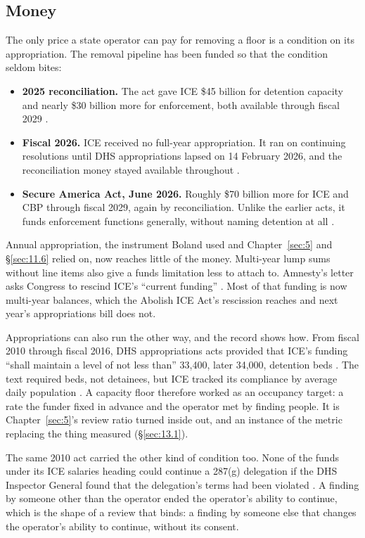 \subsection{Money}
\label{sec:9.4.3}
The only price a state operator can pay for removing a floor is a condition on its appropriation. The removal pipeline has been funded so that the condition seldom bites:

\begin{itemize}
\item \textbf{2025 reconciliation.} The act gave ICE \$45 billion for detention capacity and nearly \$30 billion more for enforcement, both available through fiscal 2029 \autocite{obbba2025}.
\item \textbf{Fiscal 2026.} ICE received no full-year appropriation. It ran on continuing resolutions until DHS appropriations lapsed on 14 February 2026, and the reconciliation money stayed available throughout \autocite{gao2026detention}.
\item \textbf{Secure America Act, June 2026.} Roughly \$70 billion more for ICE and CBP through fiscal 2029, again by reconciliation. Unlike the earlier acts, it funds enforcement functions generally, without naming detention at all \autocite{secureamerica2026,gao2026detention}.
\end{itemize}

Annual appropriation, the instrument Boland used and Chapter~\ref{sec:5} and \S\ref{sec:11.6} relied on, now reaches little of the money. Multi-year lump sums without line items also give a funds limitation less to attach to. Amnesty's letter asks Congress to rescind ICE's “current funding” \autocite{AmnestyUSA2026Letter}. Most of that funding is now multi-year balances, which the Abolish ICE Act's rescission reaches and next year's appropriations bill does not.

Appropriations can also run the other way, and the record shows how. From fiscal 2010 through fiscal 2016, DHS appropriations acts provided that ICE's funding “shall maintain a level of not less than” 33,400, later 34,000, detention beds \autocite{dhsapprop2010,Geng2018BedQuota}. The text required beds, not detainees, but ICE tracked its compliance by average daily population \autocite{Geng2018BedQuota}. A capacity floor therefore worked as an occupancy target: a rate the funder fixed in advance and the operator met by finding people. It is Chapter~\ref{sec:5}'s review ratio turned inside out, and an instance of the metric replacing the thing measured (\S\ref{sec:13.1}).

The same 2010 act carried the other kind of condition too. None of the funds under its ICE salaries heading could continue a 287(g) delegation if the DHS Inspector General found that the delegation's terms had been violated \autocite{dhsapprop2010}. A finding by someone other than the operator ended the operator's ability to continue, which is the shape of a review that binds: a finding by someone else that changes the operator's ability to continue, without its consent.
